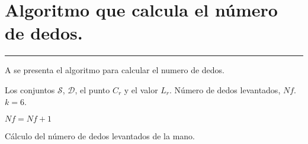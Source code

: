 \appendix{}

\chapter{Algoritmo que calcula el número de dedos.} \label{aped:C}
\vspace{-3ex}%
\noindent
\rule{\textwidth}{1pt}
\vspace{-2ex}%

A  se presenta el algoritmo para calcular el numero de dedos.  

\begin{algorithm}[h!]
\begin{algorithmic}[1]
\REQUIRE Los conjuntos $\mathcal{S}$, $\mathcal{D}$, el punto $C_r$ y el valor $L_r$.   
\ENSURE Número de dedos levantados, $Nf$.  
	\STATE $k=6$. 	
	
	\STATE $Nf=Nf+1$
	\ENDIF 
\ENDFOR 

\caption{Cálculo del número de dedos levantados de la mano.}
\label{alg:NumDedos} 
\end{algorithmic}
\end{algorithm} 